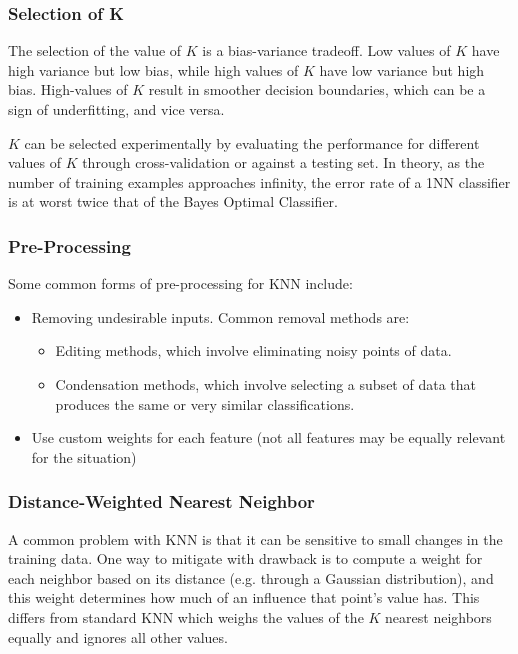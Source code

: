 \documentclass[12pt]{article}
\begin{document}
        \subsubsection{Selection of K}
            The selection of the value of $K$ is a bias-variance tradeoff. Low values of $K$ have high variance but low bias, while high values of $K$ have low variance
            but high bias. High-values of $K$ result in smoother decision boundaries, which can be a sign of underfitting, and vice versa.

            $K$ can be selected experimentally by evaluating the performance for different values of $K$ through cross-validation or against a testing set. In theory, as
            the number of training examples approaches infinity, the error rate of a 1NN classifier is at worst twice that of the Bayes Optimal Classifier.

        \subsubsection{Pre-Processing}
            Some common forms of pre-processing for KNN include:
            \begin{itemize}
              \item Removing undesirable inputs. Common removal methods are:
                \begin{itemize}
                  \item Editing methods, which involve eliminating noisy points of data.
                  \item Condensation methods, which involve selecting a subset of data that produces the same or very similar classifications.
                \end{itemize}
              \item Use custom weights for each feature (not all features may be equally relevant for the situation)
            \end{itemize}

        \subsubsection{Distance-Weighted Nearest Neighbor}
            A common problem with KNN is that it can be sensitive to small changes in the training data. One way to mitigate with drawback is to compute a weight for
            each neighbor based on its distance (e.g. through a Gaussian distribution), and this weight determines how much of an influence that point's value has.
            This differs from standard KNN which weighs the values of the $K$ nearest neighbors equally and ignores all other values.
\end{document}
